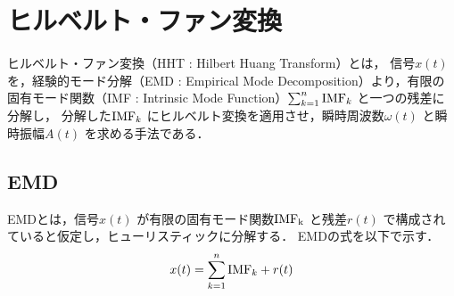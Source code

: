 \chapter{ヒルベルト・ファン変換}
%
ヒルベルト・ファン変換（HHT : Hilbert Huang Transform）とは，
信号$x(t)$ を，経験的モード分解（EMD : Empirical Mode Decomposition）より，有限の固有モード関数（IMF : Intrinsic Mode Function）$\sum_{k=1}^{n}{\rm{IMF}}_{k}$ と一つの残差に分解し，
分解した${\rm{IMF}}_{k}$ にヒルベルト変換を適用させ，瞬時周波数$\omega(t)$ と瞬時振幅$A(t)$ を求める手法である．
%



%

\section{EMD}
%
EMDとは，信号$x(t)$ が有限の固有モード関数$\rm{IMF}_{k}$ と残差$r(t)$ で構成されていると仮定し，ヒューリスティックに分解する．
EMDの式を以下で示す．
\begin{equation}
    \label{emd}
    x(t) = \sum_{k=1}^{n} {\rm{IMF}}_{k} + r(t)
\end{equation}

